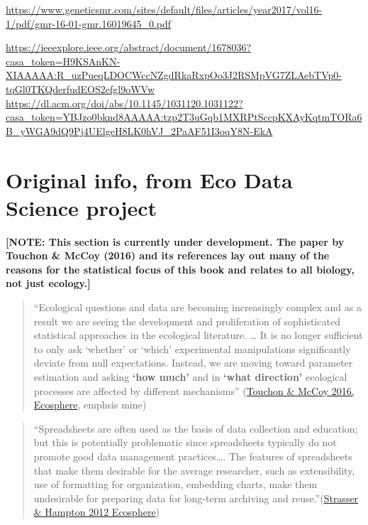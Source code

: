 \documentclass[
]{book}
\begin{document}
\url{https://www.geneticsmr.com/sites/default/files/articles/year2017/vol16-1/pdf/gmr-16-01-gmr.16019645_0.pdf}

\url{https://ieeexplore.ieee.org/abstract/document/1678036?casa_token=H9KSAnKN-XIAAAAA:R_uzPueqLDOCWccNZgdRkaRxpOo3J2RSMpVG7ZLAebTVp0-tqGl0TKQderfudEOS2efgl9oWVw}
\url{https://dl.acm.org/doi/abs/10.1145/1031120.1031122?casa_token=YBJzo0bknd8AAAAA:tzp2T3uGqb1MXRPtSccpKXAyKqtmTORa6B_yWGA9dQ9Pj4UElgeH8LK0hVJ_2PaAF51I3oqY8N-EkA}

\hypertarget{original-info-from-eco-data-science-project}{%
\section{Original info, from Eco Data Science project}\label{original-info-from-eco-data-science-project}}

\textbf{{[}NOTE: This section is currently under development. The paper by Touchon \& McCoy (2016) and its references lay out many of the reasons for the statistical focus of this book and relates to all biology, not just ecology.{]}}

\begin{quote}
``Ecological questions and data are becoming increasingly complex and as a result we are seeing the development and proliferation of sophisticated statistical approaches in the ecological literature. \ldots{} It is no longer sufficient to only ask `whether' or `which' experimental manipulations significantly deviate from null expectations. Instead, we are moving toward parameter estimation and asking \textbf{`how much'} and in \textbf{`what direction'} ecological processes are affected by different mechanisms'' (\href{https://esajournals.onlinelibrary.wiley.com/doi/abs/10.1002/ecs2.1394}{Touchon \& McCoy 2016, Ecosphere}, emphsis mine)
\end{quote}

\begin{quote}
``Spreadsheets are often used as the basis of data collection and education; but this is potentially problematic since spreadsheets typically do not promote good data management practices\ldots. The features of spreadsheets that make them desirable for the average researcher, such as extensibility, use of formatting for organization, embedding charts, make them undesirable for preparing data for long‐term archiving and reuse.''(\href{https://esajournals.onlinelibrary.wiley.com/doi/abs/10.1890/ES12-00139.1}{Strasser \& Hampton 2012 Ecosphere})
\end{quote}
\end{document}
